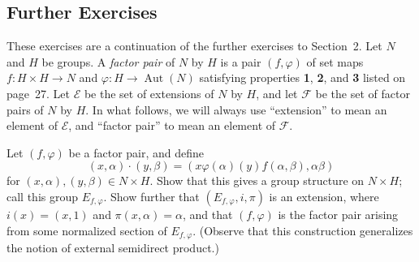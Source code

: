 \documentclass[../Odyssey_Project.tex]{subfiles}
\begin{document}
\subsection*{Further Exercises}

These exercises are a continuation of the further exercises to Section~2. Let $N$ and $H$ be groups. A \emph{factor pair} of $N$ by $H$ is a pair $(f, \varphi)$ of set maps $f: H \times H \to N$ and $\varphi: H \to \operatorname{Aut}(N)$ satisfying properties \textbf{1}, \textbf{2}, and \textbf{3} listed on page~27. Let $\mathcal{E}$ be the set of extensions of $N$ by $H$, and let $\mathcal{F}$ be the set of factor pairs of $N$ by $H$. In what follows, we will always use ``extension'' to mean an element of $\mathcal{E}$, and ``factor pair'' to mean an element of $\mathcal{F}$.

\begin{exercise}
\label{ex:9.3}
Let $(f, \varphi)$ be a factor pair, and define
\[
(x, \alpha) \cdot (y, \beta) = (x \varphi(\alpha)(y) f(\alpha, \beta), \alpha \beta)
\]
for $(x, \alpha), (y, \beta) \in N \times H$. Show that this gives a group structure on $N \times H$; call this group $E_{f, \varphi}$. Show further that $(E_{f, \varphi}, i, \pi)$ is an extension, where $i(x) = (x, 1)$ and $\pi(x, \alpha) = \alpha$, and that $(f, \varphi)$ is the factor pair arising from some normalized section of $E_{f, \varphi}$. (Observe that this construction generalizes the notion of external semidirect product.)
\end{exercise}
\end{document}
